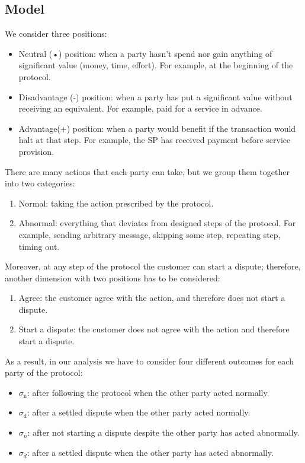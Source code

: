 \documentclass{ieeeaccess}
\begin{document}
\subsection{Model}\label{model}
We consider three positions:

\begin{itemize}
\item
  Neutral (•) position: when a party hasn't spend nor gain anything of significant value (money, time, effort). For example, at the beginning of the protocol.
\item
  Disadvantage (-) position: when a party has put a significant value without receiving an equivalent. For example, paid for a service in
  advance.
\item
  Advantage(+) position: when a party would benefit if the transaction would halt at that step. For example, the SP has received payment before service provision.
\end{itemize}

There are many actions that each party can take, but we group them together into two categories:

\begin{enumerate}
\def\labelenumi{\arabic{enumi}.}

\item
  Normal: taking the action prescribed by the protocol.
\item
  Abnormal: everything that deviates from designed steps of the protocol. For example, sending arbitrary message, skipping some step, repeating step, timing out.
\end{enumerate}

Moreover, at any step of the protocol the customer can start a dispute; therefore, another dimension with two positions has to be considered:

\begin{enumerate}
\def\labelenumi{\arabic{enumi}.}

\item
  Agree: the customer agree with the action, and therefore does not start a dispute.
\item
  Start a dispute: the customer does not agree with the action and therefore start a dispute.
\end{enumerate}

As a result, in our analysis we have to consider four different outcomes for each party of the protocol:

\begin{itemize}

\item
  $\sigma_\mathrm{n}$: after following the protocol when the other party acted normally.
\item
  $\sigma_\mathrm{d}$: after a settled dispute when the other party acted normally.
\item
  $\sigma_\overline{n}$: after not starting a dispute despite the other party has acted abnormally.
\item
  $\sigma_\overline{d}$: after a settled dispute when the other party has acted abnormally.
\end{itemize}
\end{document}
